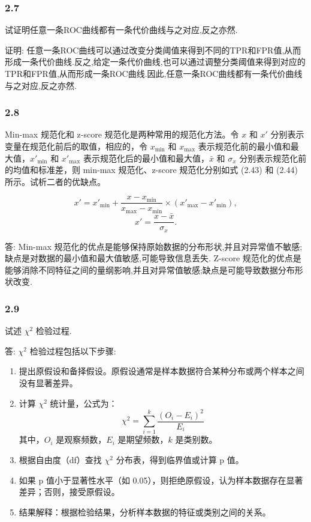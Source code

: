 \subsubsection*{2.7}
试证明任意一条ROC曲线都有一条代价曲线与之对应,反之亦然.

\par 证明: 任意一条ROC曲线可以通过改变分类阈值来得到不同的TPR和FPR值,从而形成一条代价曲线.反之,给定一条代价曲线,也可以通过调整分类阈值来得到对应的TPR和FPR值,从而形成一条ROC曲线.因此,任意一条ROC曲线都有一条代价曲线与之对应,反之亦然.
\subsubsection*{2.8}
Min-max 规范化和 z-score 规范化是两种常用的规范化方法。令 \( x \) 和 \( x' \) 分别表示变量在规范化前后的取值，相应的，令 \( x_{\text{min}} \) 和 \( x_{\text{max}} \) 表示规范化前的最小值和最大值，\( x'_{\text{min}} \) 和 \( x'_{\text{max}} \) 表示规范化后的最小值和最大值，\( \bar{x} \) 和 \( \sigma_x \) 分别表示规范化前的均值和标准差，则 min-max 规范化、z-score 规范化分别如式 (2.43) 和 (2.44) 所示。试析二者的优缺点。

\[
x' = x'_{\text{min}} + \frac{x - x_{\text{min}}}{x_{\text{max}} - x_{\text{min}}} \times (x'_{\text{max}} - x'_{\text{min}}),
\]
\[
x' = \frac{x - \bar{x}}{\sigma_x}.
\]

\par 答: Min-max 规范化的优点是能够保持原始数据的分布形状,并且对异常值不敏感;缺点是对数据的最小值和最大值敏感,可能导致信息丢失. Z-score 规范化的优点是能够消除不同特征之间的量纲影响,并且对异常值敏感;缺点是可能导致数据分布形状改变.
\subsubsection*{2.9}
试述 $\chi^2$ 检验过程.

\par 答: $\chi^2$ 检验过程包括以下步骤:
\begin{enumerate}
    \item 提出原假设和备择假设。原假设通常是样本数据符合某种分布或两个样本之间没有显著差异。
    \item 计算 $\chi^2$ 统计量，公式为：
    \[
    \chi^2 = \sum_{i=1}^{k} \frac{(O_i - E_i)^2}{E_i}
    \]
    其中，$O_i$ 是观察频数，$E_i$ 是期望频数，$k$ 是类别数。
    \item 根据自由度（df）查找 $\chi^2$ 分布表，得到临界值或计算 p 值。
    \item 如果 p 值小于显著性水平（如 0.05），则拒绝原假设，认为样本数据存在显著差异；否则，接受原假设。
    \item 结果解释：根据检验结果，分析样本数据的特征或类别之间的关系。
\end{enumerate}

